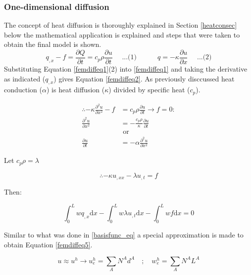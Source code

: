 	\subsubsection{One-dimensional diffusion}
The concept of heat diffusion is thoroughly explained in Section \ref{heatconsec} below the mathematical application is explained and steps that were taken to obtain the final model is shown.
	\begin{equation}\label{femdiffeq1}
	q_{,x} - f = \frac{\partial Q}{\partial t} = c_p \rho \frac{\partial u}{\partial t}\quad\text{  ...(1)} \quad\quad\quad q = -\kappa \frac{\partial u}{\partial x}\quad\text{  ...(2)}
\end{equation}
Substituting Equation \ref{femdiffeq1}(2) into \ref{femdiffeq1} and taking the derivative as indicated ($q_{,x}$) gives Equation \ref{femdiffeq2}. 
As previously disccussed heat conduction ($\alpha$) is heat diffusion ($\kappa$)  divided by specific heat ($c_p$).


\begin{equation}\label{femdiffeq2}
\begin{aligned}
\therefore -\kappa \frac{\partial^2 u}{\partial x^2} - f &= c_p\rho \frac{\partial u}{\partial t} \rightarrow f=0:\\
\frac{\partial^2 u}{\partial x^2} &= - \frac{c_p\rho}{\kappa} \frac{\partial u}{\partial t} \quad \\
&\text{ or } \\
\frac{\partial u}{\partial t} &= -\alpha \frac{\partial^2 u}{\partial x^2}
\end{aligned}
\end{equation}


Let $c_p \rho = \lambda$ 

\begin{equation}\label{femdiffeq3}
\therefore -\kappa u_{,xx} - \lambda u_{,t} = f
\end{equation}


Then:

\begin{equation}\label{femdiffeq4}
\int_0^L w q_{,x} \text{d}x - \int_0^L w \lambda u_{,t} \text{d}x - \int_0^L w f \text{d}x = 0
\end{equation}


Similar to what was done in \ref{basisfunc_eq} a special approximation is made to obtain Equation \ref{femdiffeq5}.

\begin{equation}\label{femdiffeq5}
u \approx u^h \rightarrow u_e^h = \sum_{A}N^A d^A \quad;\quad w_e^h = \sum_{A}N^A L^A
\end{equation}


